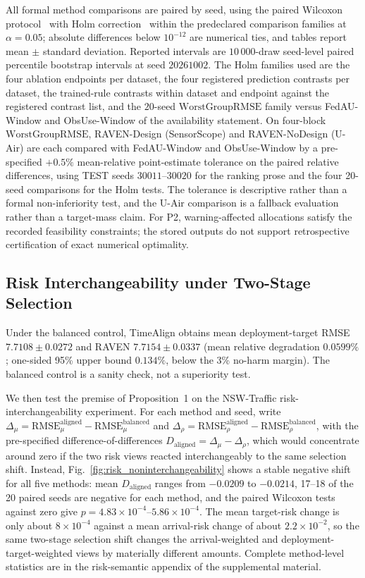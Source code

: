 \documentclass[letterpaper,journal]{IEEEtran}
\begin{document}
All formal method comparisons are paired by seed, using the paired Wilcoxon
protocol~\cite{wilcoxon1945individual} with Holm
correction~\cite{holm1979simple} within the predeclared comparison families at
$\alpha=0.05$; absolute differences below $10^{-12}$ are numerical ties, and
tables report mean $\pm$ standard deviation.  Reported intervals are
$10\,000$-draw seed-level paired percentile bootstrap intervals at seed
$20261002$.  The Holm families used are the four ablation endpoints per dataset,
the four registered prediction contrasts per dataset, the trained-rule contrasts
within dataset and endpoint against the registered contrast list, and the
$20$-seed $\mathrm{WorstGroupRMSE}$ family versus FedAU-Window and ObsUse-Window
of the availability statement.  On four-block
$\mathrm{WorstGroupRMSE}$, RAVEN-Design (SensorScope) and RAVEN-NoDesign (U-Air)
are each compared with FedAU-Window and ObsUse-Window by a pre-specified $+0.5\%$
mean-relative point-estimate tolerance on the paired relative differences, using
TEST seeds $30011$--$30020$ for the ranking prose and the four 20-seed
comparisons for the Holm tests.  The tolerance is descriptive rather than a
formal non-inferiority test, and the U-Air comparison is a fallback evaluation
rather than a target-mass claim.  For P2, warning-affected allocations satisfy
the recorded feasibility constraints; the stored outputs do not support
retrospective certification of exact numerical optimality.

\subsection{Risk Interchangeability under Two-Stage Selection}
\label{subsec:eval_rq1}

Under the balanced control, TimeAlign obtains mean deployment-target
RMSE $7.7108\pm0.0272$ and RAVEN $7.7154\pm0.0337$ (mean relative
degradation $0.0599\%$; one-sided 95\% upper bound $0.134\%$, below the
3\% no-harm margin).  The balanced control is a sanity check, not a superiority
test.

We then test the premise of Proposition~1 on the NSW-Traffic
risk-interchangeability experiment.  For each method and seed, write
$\Delta_{\mu}=\mathrm{RMSE}_{\mu}^{\mathrm{aligned}}
-\mathrm{RMSE}_{\mu}^{\mathrm{balanced}}$ and
$\Delta_{\rho}=\mathrm{RMSE}_{\rho}^{\mathrm{aligned}}
-\mathrm{RMSE}_{\rho}^{\mathrm{balanced}}$, with the pre-specified
difference-of-differences $D_{\mathrm{aligned}}=\Delta_{\mu}-\Delta_{\rho}$,
which would concentrate around zero if the two risk views reacted
interchangeably to the same selection shift.  Instead,
Fig.~\ref{fig:risk_noninterchangeability} shows a stable negative shift for all
five methods: mean $D_{\mathrm{aligned}}$ ranges from $-0.0209$ to $-0.0214$,
17--18 of the 20 paired seeds are negative for each method, and the paired
Wilcoxon tests against zero give $p=4.83\times10^{-4}$--$5.86\times10^{-4}$.  The
mean target-risk change is only about $8\times10^{-4}$ against a mean arrival-risk
change of about $2.2\times10^{-2}$, so the same two-stage selection shift changes
the arrival-weighted and deployment-target-weighted views by materially different
amounts.  Complete method-level statistics are in the risk-semantic appendix of
the supplemental material.
\end{document}
